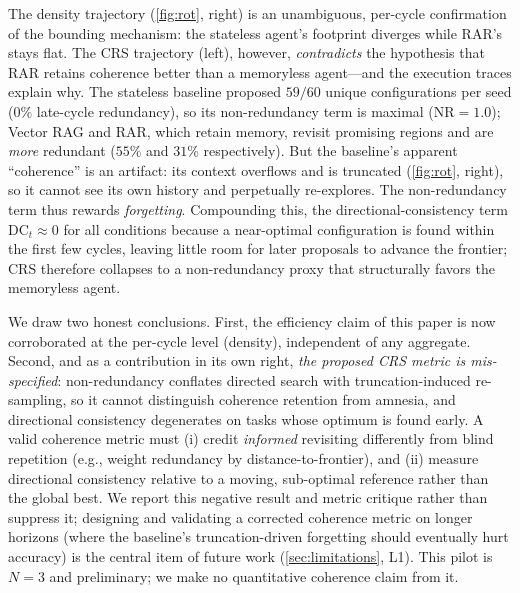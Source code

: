 \documentclass[conference]{IEEEtran}
\newcommand{\NR}{\mathrm{NR}}
\newcommand{\DC}{\mathrm{DC}}
\begin{document}
The density trajectory (\cref{fig:rot}, right) is an unambiguous, per-cycle confirmation of the bounding mechanism: the stateless agent's footprint diverges while RAR's stays flat. The CRS trajectory (left), however, \emph{contradicts} the hypothesis that RAR retains coherence better than a memoryless agent---and the execution traces explain why. The stateless baseline proposed $59/60$ unique configurations per seed ($0\%$ late-cycle redundancy), so its non-redundancy term is maximal ($\NR{=}1.0$); Vector RAG and RAR, which retain memory, revisit promising regions and are \emph{more} redundant ($55\%$ and $31\%$ respectively). But the baseline's apparent ``coherence'' is an artifact: its context overflows and is truncated (\cref{fig:rot}, right), so it cannot see its own history and perpetually re-explores. The non-redundancy term thus rewards \emph{forgetting}. Compounding this, the directional-consistency term $\DC_t \approx 0$ for all conditions because a near-optimal configuration is found within the first few cycles, leaving little room for later proposals to advance the frontier; CRS therefore collapses to a non-redundancy proxy that structurally favors the memoryless agent.

We draw two honest conclusions. First, the efficiency claim of this paper is now corroborated at the per-cycle level (density), independent of any aggregate. Second, and as a contribution in its own right, \emph{the proposed CRS metric is mis-specified}: non-redundancy conflates directed search with truncation-induced re-sampling, so it cannot distinguish coherence retention from amnesia, and directional consistency degenerates on tasks whose optimum is found early. A valid coherence metric must (i) credit \emph{informed} revisiting differently from blind repetition (e.g., weight redundancy by distance-to-frontier), and (ii) measure directional consistency relative to a moving, sub-optimal reference rather than the global best. We report this negative result and metric critique rather than suppress it; designing and validating a corrected coherence metric on longer horizons (where the baseline's truncation-driven forgetting should eventually hurt accuracy) is the central item of future work (\cref{sec:limitations}, L1). This pilot is $N{=}3$ and preliminary; we make no quantitative coherence claim from it.
\end{document}
